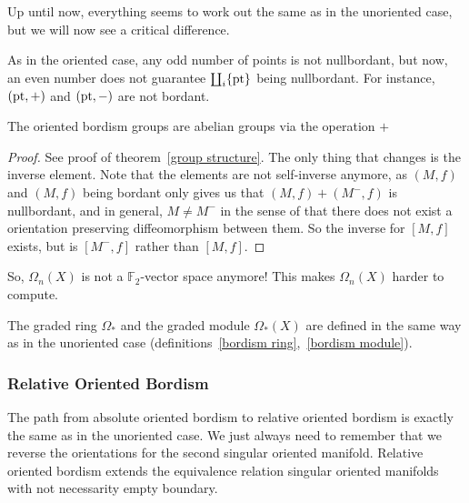 \documentclass[a4paper,11pt]{article}
\begin{document}
Up until now, everything seems to work out the same as in the unoriented case, but we will now see a critical difference.

\begin{observation}
    As in the oriented case, any odd number of points is not nullbordant, but now, an even number does not guarantee \(\coprod_i\{\mathrm{pt}\}\) being nullbordant. For instance, \((\mathrm{pt},+)\) and \((\mathrm{pt},-)\) are not bordant.
\end{observation}

\begin{theorem}
    The oriented bordism groups are abelian groups via the operation \(+\)
\end{theorem}

\begin{proof}
    See proof of theorem\ \ref{group structure}. The only thing that changes is the inverse element. Note that the elements are not self-inverse anymore, as \((M,f)\) and \((M,f)\) being bordant only gives us that \((M,f)+(M^-,f)\) is nullbordant, and in general, \(M\neq M^-\) in the sense of that there does not exist a orientation preserving diffeomorphism between them. So the inverse for \([M,f]\) exists, but is \([M^-,f]\) rather than \([M,f]\).
\end{proof}

So, \(\Omega_n(X)\) is not a \(\mathbb{F}_2\)-vector space anymore! This makes \(\Omega_n(X)\) harder to compute.

The graded ring \(\Omega_\ast\) and the graded module \(\Omega_\ast(X)\) are defined in the same way as in the unoriented case (definitions\ \ref{bordism ring},\ \ref{bordism module}).


\subsubsection{Relative Oriented Bordism}

The path from absolute oriented bordism to relative oriented bordism is exactly the same as in the unoriented case. We just always need to remember that we reverse the orientations for the second singular oriented manifold. Relative oriented bordism extends the equivalence relation singular oriented manifolds with not necessarity empty boundary.
\end{document}
